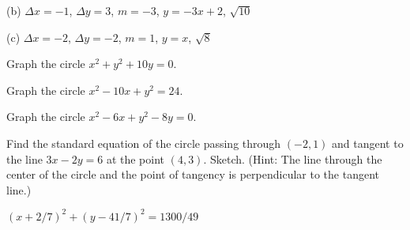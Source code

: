 \begin{exercises}
\begin{exercise}
\begin{answer}
{}(b) $\Delta x=-1$, $\Delta y = 3$, $m=-3$, $y=-3x+2$, $\sqrt{10}$

{}(c) $\Delta x=-2$, $\Delta y = -2$, $m=1$, $y=x$, $\sqrt{8}$
\end{answer}\end{exercise}

\begin{exercise}
Graph the circle $x^2+y^2+10y=0$.
\end{exercise}

\begin{exercise}
Graph the circle $x^2-10x+y^2=24$.
\end{exercise}

\begin{exercise}
Graph the circle $x^2-6x+y^2-8y=0$.
\end{exercise}

\begin{exercise} Find the standard equation of the circle passing through $(-2,1)$
 and tangent to the line $3x-2y =6$ at the point $(4,3)$.  Sketch. 
 (Hint: The line through the center of the circle and the point of tangency
 is perpendicular to the tangent line.)
\begin{answer} $(x+2/7)^2+(y-41/7)^2=1300/49$
\end{answer}\end{exercise}

\end{exercises}
